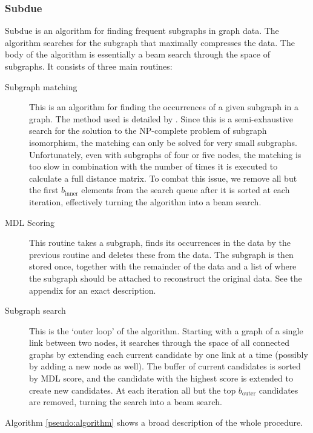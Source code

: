 \documentclass{article}
\begin{document}
\subsubsection*{Subdue}

Subdue \cite{jonyer2004mdl,ketkar2005subdue} is an algorithm for finding frequent subgraphs in graph data. The algorithm searches for the subgraph that maximally compresses the data. The body of the algorithm is essentially a beam search through the space of subgraphs. It consists of three main routines:

\begin{description}
\item[Subgraph matching] This is an algorithm for finding the occurrences of a given subgraph in a graph. The method used is detailed by . Since this is  a semi-exhaustive search for the solution to the NP-complete problem of subgraph isomorphism, the matching can only be solved for very small subgraphs. Unfortunately, even with subgraphs of four or five nodes, the matching is too slow in combination with the number of times it is executed to calculate a full distance matrix. To combat this issue, we remove all but the first $b_{\mbox{inner}}$ elements from the search queue after it is sorted at each iteration, effectively turning the algorithm into a beam search.
\item[MDL Scoring]
This routine takes a subgraph, finds its occurrences in the data by the previous routine and deletes these from the data. The subgraph is then stored once, together with the remainder of the data and a list of where the subgraph should be attached to reconstruct the original data. See the appendix for an exact description.
\item[Subgraph search]
This is the `outer loop' of the algorithm. Starting with a graph of a single link between two nodes, it searches through the space of all connected graphs by extending each current candidate by one link at a time (possibly by adding a new node as well). The buffer of current candidates is sorted by MDL score, and the candidate with the highest score is extended to create new candidates. At each iteration all but the top $b_{\mbox{outer}}$ candidates are removed, turning the search into a beam search.
\end{description}

Algorithm \ref{pseudo:algorithm} shows a broad description of the whole procedure.
\end{document}
